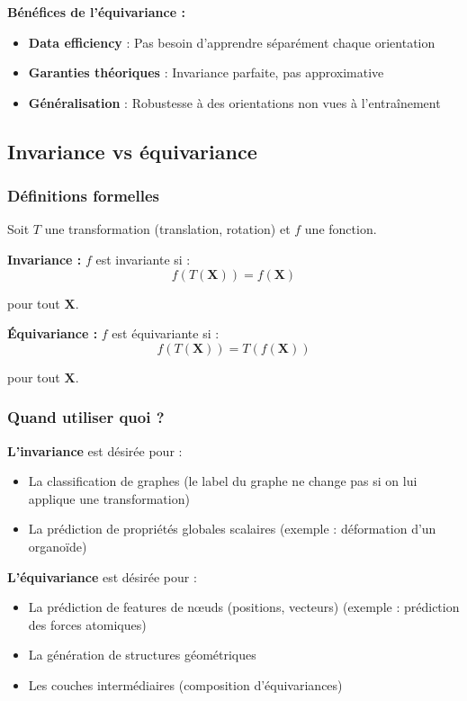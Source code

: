 \textbf{Bénéfices de l'équivariance :}
\begin{itemize}
    \item \textbf{Data efficiency} : Pas besoin d'apprendre séparément chaque orientation
    \item \textbf{Garanties théoriques} : Invariance parfaite, pas approximative
    \item \textbf{Généralisation} : Robustesse à des orientations non vues à l'entraînement
\end{itemize}

\subsection{Invariance vs équivariance}

\subsubsection{Définitions formelles}

Soit $T$ une transformation (translation, rotation) et $f$ une fonction.

\textbf{Invariance :}
$f$ est invariante si :
\[
f(T(\mathbf{X})) = f(\mathbf{X})
\]

pour tout $\mathbf{X}$.

\textbf{Équivariance :}
$f$ est équivariante si :
\[
f(T(\mathbf{X})) = T(f(\mathbf{X}))
\]

pour tout $\mathbf{X}$.

\subsubsection{Quand utiliser quoi ?}

\textbf{L'invariance} est désirée pour :
\begin{itemize}
    \item La classification de graphes (le label du graphe ne change pas si on lui applique une transformation)
    \item La prédiction de propriétés globales scalaires (exemple : déformation d'un organoïde)
\end{itemize}

\textbf{L'équivariance} est désirée pour :
\begin{itemize}
    \item La prédiction de features de nœuds (positions, vecteurs) (exemple : prédiction des forces atomiques)
    \item La génération de structures géométriques
    \item Les couches intermédiaires (composition d'équivariances)
\end{itemize}

